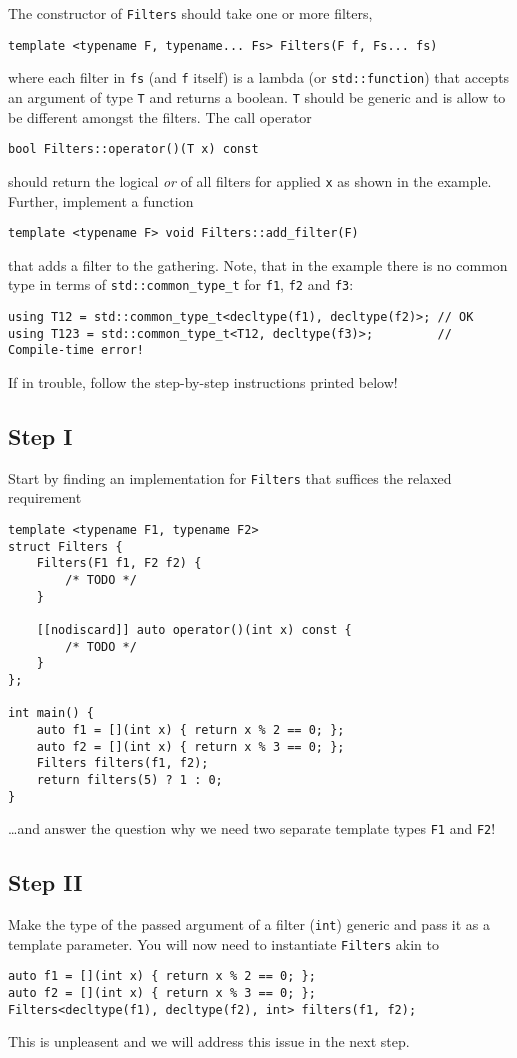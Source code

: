 The constructor of \texttt{Filters} should take one or more filters,
\begin{lstlisting}
template <typename F, typename... Fs> Filters(F f, Fs... fs)
\end{lstlisting}
where each filter in \texttt{fs} (and \texttt{f} itself) is a lambda (or \texttt{std::function}) that accepts an argument of type \texttt{T} and returns a boolean. \texttt{T} should be generic and is allow to be different amongst the filters.
The call operator 
\begin{lstlisting}
bool Filters::operator()(T x) const
\end{lstlisting}
should return the logical \textit{or} of all filters for applied \texttt{x} as shown in the example.
Further, implement a function
\begin{lstlisting}
template <typename F> void Filters::add_filter(F)
\end{lstlisting}
that adds a filter to the gathering. Note, that in the example there is no common type in terms of \texttt{std::common\_type\_t} for \texttt{f1}, \texttt{f2} and \texttt{f3}:
\begin{lstlisting}
using T12 = std::common_type_t<decltype(f1), decltype(f2)>; // OK
using T123 = std::common_type_t<T12, decltype(f3)>;         // Compile-time error!
\end{lstlisting}

If in trouble, follow the step-by-step instructions printed below!

\subsection{Step I}
Start by finding an implementation for \texttt{Filters} that suffices the relaxed requirement
\begin{lstlisting}
template <typename F1, typename F2>
struct Filters {
    Filters(F1 f1, F2 f2) {
        /* TODO */
    }

    [[nodiscard]] auto operator()(int x) const {
        /* TODO */
    }
};

int main() {
    auto f1 = [](int x) { return x % 2 == 0; };
    auto f2 = [](int x) { return x % 3 == 0; };
    Filters filters(f1, f2);
    return filters(5) ? 1 : 0;
}
\end{lstlisting}
\ldots and answer the question why we need two separate template types \texttt{F1} and \texttt{F2}!

\subsection{Step II}
Make the type of the passed argument of a filter (\texttt{int}) generic and pass it as a template parameter. You will now need to instantiate \texttt{Filters} akin to
\begin{lstlisting}
auto f1 = [](int x) { return x % 2 == 0; };
auto f2 = [](int x) { return x % 3 == 0; };
Filters<decltype(f1), decltype(f2), int> filters(f1, f2);
\end{lstlisting}
This is unpleasent and we will address this issue in the next step.

